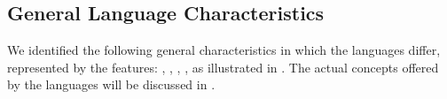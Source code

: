 




	
\subsection{General Language Characteristics}\label{sec:langcharacteristics}
We identified the following general characteristics in which the languages differ, represented by the features: \fnotation, \fsemantics, \flangparadigm, \fextensibility, as illustrated in . The actual concepts offered by the languages will be discussed in .

